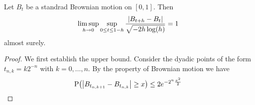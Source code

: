 \begin{theorem}[L\'evy]
    Let $B_t$ be a standrad Brownian motion on $[0,1]$. Then 
    \begin{equation*}
        \limsup_{h\to 0}\sup_{0\leq t\leq 1-h}\frac{\left\lvert {B_{t+h} - B_t} \right\rvert}{\sqrt{-2h\log(h)}} = 1
    \end{equation*}
    almost surely. 
\end{theorem}
\begin{proof}
    We first establish the upper bound. Consider the dyadic points of the form 
    $t_{n,k} = k2^{-n}$ with $k=0,\ldots,n$. By the property of Brownian motion 
    we have 
    \begin{equation*}
        \P\pth{\abs{B_{t_{n,k+1}} - B_{t_{n,k}}}\geq x} \leq 2e^{-2^n\frac{x^2}{2}}
    \end{equation*} 
\end{proof}